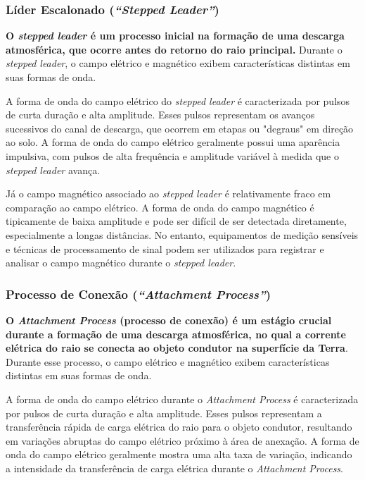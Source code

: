 \documentclass[a4paper, 12pt, onecolumn,singlespacing]{article}
\begin{document}
	\subsubsection{Líder Escalonado (\textit{``Stepped Leader''})}
	
		\textbf{O \textit{stepped leader} é um processo inicial na formação de uma descarga atmosférica, que ocorre antes do retorno do raio principal.} Durante o \textit{stepped leader}, o campo elétrico e magnético exibem características distintas em suas formas de onda.
		
		A forma de onda do campo elétrico do \textit{stepped leader} é caracterizada por pulsos de curta duração e alta amplitude. Esses pulsos representam os avanços sucessivos do canal de descarga, que ocorrem em etapas ou "degraus" em direção ao solo. A forma de onda do campo elétrico geralmente possui uma aparência impulsiva, com pulsos de alta frequência e amplitude variável à medida que o \textit{stepped leader} avança.
		
		Já o campo magnético associado ao \textit{stepped leader} é relativamente fraco em comparação ao campo elétrico. A forma de onda do campo magnético é tipicamente de baixa amplitude e pode ser difícil de ser detectada diretamente, especialmente a longas distâncias. No entanto, equipamentos de medição sensíveis e técnicas de processamento de sinal podem ser utilizados para registrar e analisar o campo magnético durante o \textit{stepped leader}.
		
	\subsubsection{Processo de Conexão (\textit{``Attachment Process''})}
	
		\textbf{O \textit{Attachment Process} (processo de conexão) é um estágio crucial durante a formação de uma descarga atmosférica, no qual a corrente elétrica do raio se conecta ao objeto condutor na superfície da Terra}. Durante esse processo, o campo elétrico e magnético exibem características distintas em suas formas de onda.
		
		A forma de onda do campo elétrico durante o \textit{Attachment Process} é caracterizada por pulsos de curta duração e alta amplitude. Esses pulsos representam a transferência rápida de carga elétrica do raio para o objeto condutor, resultando em variações abruptas do campo elétrico próximo à área de anexação. A forma de onda do campo elétrico geralmente mostra uma alta taxa de variação, indicando a intensidade da transferência de carga elétrica durante o \textit{Attachment Process}.
		
\end{document}
